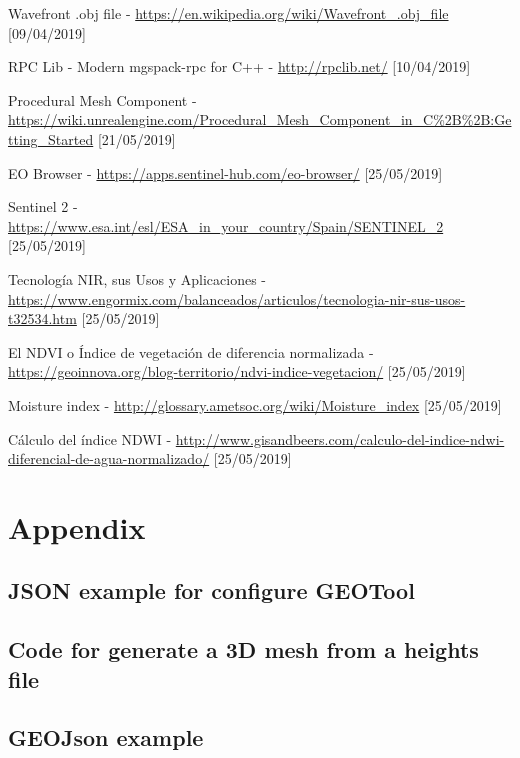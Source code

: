 \documentclass[10pt,a4paper,twocolumn,twoside]{article}
\begin{document}
\begin{thebibliography}{11}
Wavefront .obj file - \url{https://en.wikipedia.org/wiki/Wavefront_.obj_file} [09/04/2019]

RPC Lib - Modern mgspack-rpc for C++ - \url{http://rpclib.net/} [10/04/2019]

Procedural Mesh Component - \url{https://wiki.unrealengine.com/Procedural_Mesh_Component_in_C%2B%2B:Getting_Started} [21/05/2019]

EO Browser - \url{https://apps.sentinel-hub.com/eo-browser/} [25/05/2019]

Sentinel 2 - \url{https://www.esa.int/esl/ESA_in_your_country/Spain/SENTINEL_2} [25/05/2019]

Tecnología NIR, sus Usos y Aplicaciones - \url{https://www.engormix.com/balanceados/articulos/tecnologia-nir-sus-usos-t32534.htm} [25/05/2019]

El NDVI o Índice de vegetación de diferencia normalizada - \url{https://geoinnova.org/blog-territorio/ndvi-indice-vegetacion/} [25/05/2019]

Moisture index - \url{http://glossary.ametsoc.org/wiki/Moisture_index} [25/05/2019]

Cálculo del índice NDWI - \url{http://www.gisandbeers.com/calculo-del-indice-ndwi-diferencial-de-agua-normalizado/} [25/05/2019]

\end{thebibliography}

\newpage
\appendix
\section*{Appendix}

\setcounter{section}{1}

\subsection{JSON example for configure GEOTool}
\label{appendix:geotoolconfig}


\subsection{Code for generate a 3D mesh from a heights file}
\label{appendix:generateobj}


\subsection{GEOJson example}
\label{appendix:geojson}

\end{document}

